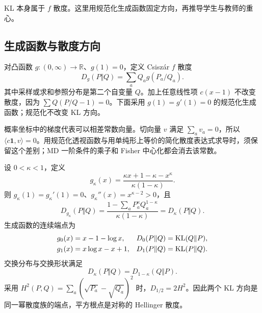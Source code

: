 \label{sec:proximal-divergence-map}

KL 本身属于 $f$ 散度。这里用规范化生成函数固定方向，再推导学生与教师的重心。

\subsection{生成函数与散度方向}

对凸函数 $g:(0,\infty)\to\mathbb R$、$g(1)=0$，定义 Csisz\'ar $f$ 散度
\begin{equation}
 D_g(P\Vert Q)=\sum_a Q_a g(P_a/Q_a).
 \label{eq:divergence-map-csiszar}
\end{equation}
其中采样或求和参照分布是第二个自变量 $Q$。加上任意线性项 $c(x-1)$ 不改变散度，因为 $\sum Q(P/Q-1)=0$。下面采用 $g(1)=g'(1)=0$ 的规范化生成函数；规范化不改变 KL 方向。

概率坐标中的梯度代表可以相差常数向量。切向量 $v$ 满足 $\sum_av_a=0$，所以 $\langle c\boldsymbol1,v\rangle=0$。用规范化透视函数与用单纯形上等价的简化散度表达式求导时，须保留这个差别；MD 一阶条件的乘子和 Fisher 中心化都会消去该常数。

\begin{theorem}
\label{thm:divergence-map-power}
设 $0<\kappa<1$，定义
\begin{equation}
 g_\kappa(x)=\frac{\kappa x+1-\kappa-x^\kappa}{\kappa(1-\kappa)}.
 \label{eq:divergence-map-power-generator}
\end{equation}
则 $g_\kappa(1)=g_\kappa'(1)=0$、$g_\kappa''(x)=x^{\kappa-2}>0$，且
\begin{equation}
 D_{g_\kappa}(P\Vert Q)
 =\frac{1-\sum_a P_a^\kappa Q_a^{1-\kappa}}{\kappa(1-\kappa)}
 =D_\kappa(P\Vert Q).
 \label{eq:proximal-power-divergence}
\end{equation}
生成函数的连续端点为
\begin{align}
 g_0(x)&=x-1-\log x,&D_0(P\Vert Q)&=\operatorname{KL}(Q\Vert P),\\
 g_1(x)&=x\log x-x+1,&D_1(P\Vert Q)&=\operatorname{KL}(P\Vert Q).
 \label{eq:divergence-map-kl-endpoints}
\end{align}
交换分布与交换形状满足
\begin{equation}
 D_\kappa(P\Vert Q)=D_{1-\kappa}(Q\Vert P).
 \label{eq:divergence-map-duality}
\end{equation}
采用 $H^2(P,Q)=\sum_a(\sqrt{P_a}-\sqrt{Q_a})^2$ 时，$D_{1/2}=2H^2$。因此两个 KL 方向是同一幂散度族的端点，平方根点是对称的 Hellinger 散度。
\end{theorem}

